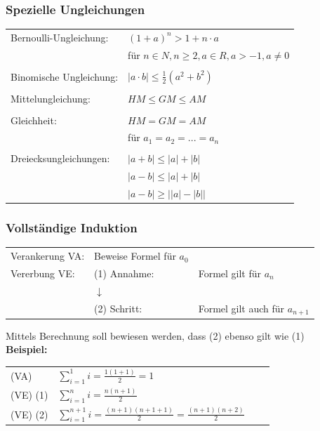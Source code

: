 		\subsubsection{Spezielle Ungleichungen}
			\begin{tabular}{ll} 
				Bernoulli-Ungleichung: & $(1 + a)^n > 1 + n \cdot a$\\
				                       & für $n \in N, n \geq 2, a \in R, a > -1, a\neq0$ \\
				\\
				Binomische Ungleichung: & $|a\cdot b|\leq\frac{1}{2}(a^2 + b^2)$\\ 
				\\
				Mittelungleichung: & $ HM \leq GM \leq AM $\\
				\\
				Gleichheit: & $ HM = GM = AM$ \\
				            & für $a_1 = a_2 = ... = a_n$ \\
				\\
				Dreiecksungleichungen: & $\left|a+b\right|\leq\left|a\right|+\left|b\right|$ \\
				                       & 	$\left|a-b\right|\leq\left|a\right|+\left|b\right|$  \\
				                       & $\left|a-b\right|\geq\left|\left|a\right|-\left|b\right|\right|$ \\
			\end{tabular}
				
		\subsubsection{Vollständige Induktion}	
			\begin{tabular}{lll} 
				Verankerung VA: & Beweise Formel für $a_0$ & \\
				Vererbung VE:   & (1) Annahme: & Formel gilt für $a_n$ \\
				                & $\downarrow$ & \\
				                & (2) Schritt: & Formel gilt auch für $a_{n+1}$ \\
			\end{tabular}
				
			Mittels Berechnung soll bewiesen werden, dass (2) ebenso gilt wie (1) \\

			\textbf{Beispiel:} \\
			
			\begin{tabular}{llll} 
				(VA) & $\sum \limits_{i=1}^1 i = \frac{1(1+1)}{2} = 1 $ \\
				(VE) (1) & $\sum \limits_{i=1}^n i = \frac{n(n+1)}{2}$  \\
				(VE) (2) & $\sum \limits_{i=1}^{n+1} i = \frac{(n+1)(n+1 + 1)}{2} = \frac{(n+1)(n+2)}{2} $  \\
			\end{tabular}
	
